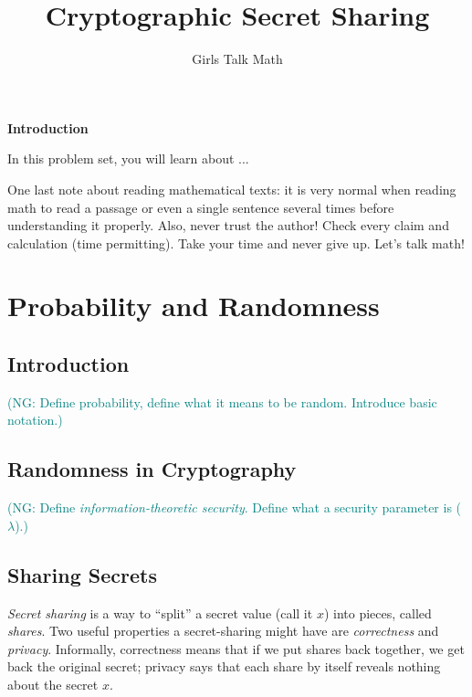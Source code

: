 \documentclass[12 pt]{article}
\title{Cryptographic Secret Sharing}
\author{Girls Talk Math}
\date{}
\newcommand{\nsm}[1]{\textcolor{teal}{(NG: #1)}}
\newcounter{exercise}[section]
\begin{document}
\maketitle
\vskip 1in
\begin{center} \textbf{Introduction} \end{center}

\indent In this problem set, you will learn about ...
    
    One last note about reading mathematical texts: it is very normal when reading math to read a passage or even a single sentence several times before understanding it properly. Also, never trust the author! Check every claim and calculation (time permitting). Take your time and never give up. Let's talk math!
	
\newpage

\tableofcontents



\newpage


\section{Probability and Randomness}

\subsection{Introduction}
\nsm{Define probability, define what it means to be 
random. Introduce basic notation.}

\subsection{Randomness in Cryptography}
\nsm{Define \emph{information-theoretic security}.
Define what a security parameter is ($\lambda$).}

\subsection{Sharing Secrets}
\emph{Secret sharing} is a way to ``split'' a secret value (call it $x$) into pieces, called \emph{shares}. 
Two useful properties a secret-sharing might have are \emph{correctness} and 
\emph{privacy}. Informally, correctness means that if we put shares back together, 
we get back the original secret; privacy says that each share by itself reveals 
nothing about the secret $x$. 
\end{document}
